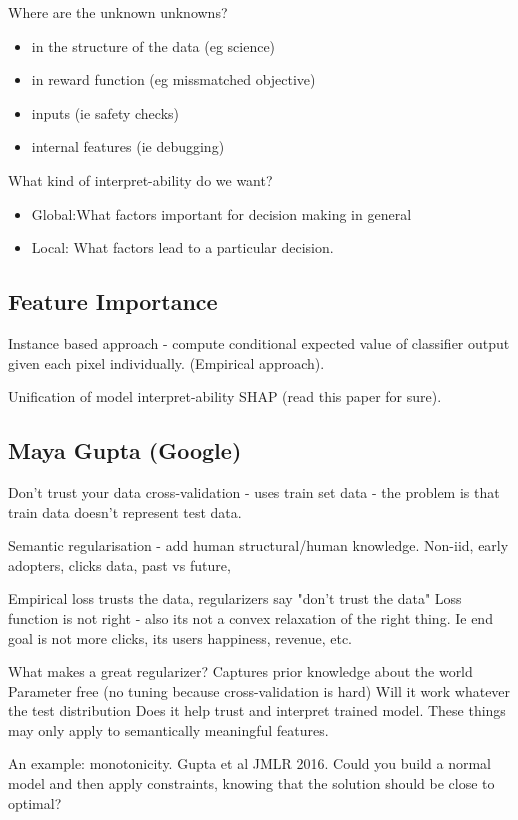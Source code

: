 \documentclass{article}
\theoremstyle{plain}
\theoremstyle{definition}
\begin{document}
Where are the unknown unknowns?
\begin{itemize}
\item in the structure of the data (eg science)
\item in reward function (eg missmatched objective)
\item inputs (ie safety checks)
\item internal features (ie debugging)
\end{itemize}
What kind of interpret-ability do we want?
\begin{itemize}
\item Global:What factors important for decision making in general
\item Local: What factors lead to a particular decision.
\end{itemize}


\subsection{Feature Importance}
Instance based approach  - compute conditional expected value of classifier output given each pixel individually. (Empirical approach).

Unification of model interpret-ability SHAP (read this paper for sure).

\subsection{Maya Gupta (Google)}
Don't trust your data
cross-validation - uses train set data - the problem is that train data doesn't represent test data. 

Semantic regularisation - add human structural/human knowledge. 
Non-iid, early adopters, clicks data, past vs future, 

Empirical loss trusts the data, regularizers say "don't trust the data"
Loss function is not right - also its not a convex relaxation of the right thing. Ie end goal is not more clicks, its users happiness, revenue, etc.

What makes a great regularizer? 
Captures prior knowledge about the world
Parameter free (no tuning because cross-validation is hard)
Will it work whatever the test distribution
Does it help trust and interpret trained model.
These things may only apply to semantically meaningful features.  

An example: monotonicity. Gupta et al JMLR 2016.
Could you build a normal model and then apply constraints, knowing that the solution should be close to optimal?  
\end{document}
